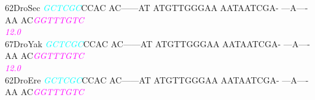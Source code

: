 \documentclass[11pt,twoside,reqno,a4paper]{article}
\begin{document}
{62\hspace*{2\charwidth}DroSec	\textit{\textcolor{cyan}{G}}\textit{\textcolor{cyan}{C}}\textit{\textcolor{cyan}{T}}\textit{\textcolor{cyan}{C}}\textit{\textcolor{cyan}{G}}\textit{\textcolor{cyan}{C}}CCAC	AC------AT	ATGTTGGGAA	AATAATCGA-	---A----AA	AC\textit{\textcolor{magenta}{G}}\textit{\textcolor{magenta}{G}}\textit{\textcolor{magenta}{T}}\textit{\textcolor{magenta}{T}}\textit{\textcolor{magenta}{T}}\textit{\textcolor{magenta}{G}}\textit{\textcolor{magenta}{T}}\textit{\textcolor{magenta}{C}}	\\
\hspace*{4\charwidth}\hspace*{7\charwidth}\hspace*{1\charwidth}\hspace*{1\charwidth}\hspace*{1\charwidth}\hspace*{1\charwidth}\hspace*{1\charwidth}\hspace*{52\charwidth}\textit{\textcolor{magenta}{12.0}}\hspace*{1\charwidth}\\
67\hspace*{2\charwidth}DroYak	\textit{\textcolor{cyan}{G}}\textit{\textcolor{cyan}{C}}\textit{\textcolor{cyan}{T}}\textit{\textcolor{cyan}{C}}\textit{\textcolor{cyan}{G}}\textit{\textcolor{cyan}{C}}CCAC	AC------AT	ATGTTGGGAA	AATAATCGA-	---A----AA	AC\textit{\textcolor{magenta}{G}}\textit{\textcolor{magenta}{G}}\textit{\textcolor{magenta}{T}}\textit{\textcolor{magenta}{T}}\textit{\textcolor{magenta}{T}}\textit{\textcolor{magenta}{G}}\textit{\textcolor{magenta}{T}}\textit{\textcolor{magenta}{C}}	\\
\hspace*{4\charwidth}\hspace*{7\charwidth}\hspace*{1\charwidth}\hspace*{1\charwidth}\hspace*{1\charwidth}\hspace*{1\charwidth}\hspace*{1\charwidth}\hspace*{52\charwidth}\textit{\textcolor{magenta}{12.0}}\hspace*{1\charwidth}\\
62\hspace*{2\charwidth}DroEre	\textit{\textcolor{cyan}{G}}\textit{\textcolor{cyan}{C}}\textit{\textcolor{cyan}{T}}\textit{\textcolor{cyan}{C}}\textit{\textcolor{cyan}{G}}\textit{\textcolor{cyan}{C}}CCAC	AC------AT	ATGTTGGGAA	AATAATCGA-	---A----AA	AC\textit{\textcolor{magenta}{G}}\textit{\textcolor{magenta}{G}}\textit{\textcolor{magenta}{T}}\textit{\textcolor{magenta}{T}}\textit{\textcolor{magenta}{T}}\textit{\textcolor{magenta}{G}}\textit{\textcolor{magenta}{T}}\textit{\textcolor{magenta}{C}}	\\
}
\end{document}
